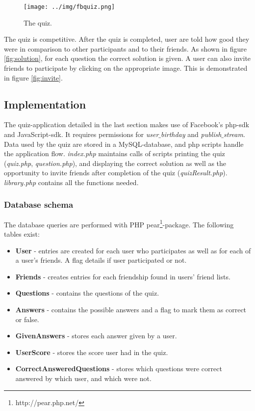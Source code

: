 \documentclass[preprint,12pt]{elsarticle}
\begin{document}
\begin{figure}
  \texttt{[image: ../img/fbquiz.png]}
 \caption{The quiz.}
\label{fig:quiz}
\end{figure}


The quiz is competitive. After the quiz is completed, user are told
how good they were in comparison to other participants and to their
friends. As shown in figure \ref{fig:solution}, for each question the
correct solution is given. A user can also invite friends to
participate by clicking on the appropriate image. This is demonstrated in
figure \ref{fig:invite}.


\subsection{Implementation}
\label{sec:implementation}
The quiz-application detailed in the last section makes use of
Facebook's php-\ac{sdk} and JavaScript-\ac{sdk}. It requires
permissions for \textit{user$\_$birthday} and
\textit{publish$\_$stream}.
Data used by the quiz are stored in a MySQL-database, and php scripts
handle the application flow. \textit{index.php} maintains calls of
scripts printing the quiz (\textit{quiz.php}, \textit{question.php}), and displaying
the correct solution as well as the opportunity to invite friends
after completion of the quiz
(\textit{quizResult.php}). \textit{library.php} contains all the
functions needed.


\subsubsection{Database schema}
\label{sec:database-schema}
The database queries are performed with PHP
pear\footnote{http://pear.php.net/}-package. The following tables exist:
\begin{itemize}
\item \textbf{User} - entries are created for each user who participates as
well as for each of a user's friends. A flag details if user
participated or not.
\item \textbf{Friends} - creates entries for each friendship found in
users' friend lists.
\item \textbf{Questions} - contains the questions of the quiz.
\item \textbf{Answers} - contains the possible answers and a flag to mark them
as correct or false.
\item \textbf{GivenAnswers} - stores each answer given by a user.
\item \textbf{UserScore} - stores the score user had in the quiz.
\item \textbf{CorrectAnsweredQuestions} - stores which questions were correct
answered by which user, and which were not.
\end{itemize}
\end{document}
